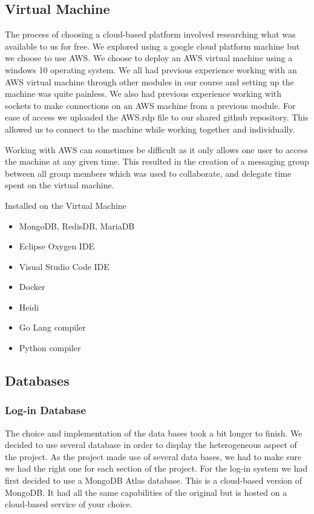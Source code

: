 \subsection{Virtual Machine}
The process of choosing a cloud-based platform involved researching what was available to us for free. We explored using a google cloud platform machine but we choose to use AWS. We choose to deploy an AWS virtual machine using a windows 10 operating system. We all had previous experience working with an AWS virtual machine through other modules in our course and setting up the machine was quite painless. We also had previous experience working with sockets to make connections on an AWS machine from a previous module. For ease of access we uploaded the AWS.rdp file to our shared github repository. This allowed us to connect to the machine while working together and individually.\newline

Working with AWS can sometimes be difficult as it only allows one user to access the machine at any given time. This resulted in the creation of a messaging group between all group members which was used to collaborate, and delegate time spent on the virtual machine.\newline
\cite{13214346620180901}

\newline
Installed on the Virtual Machine
\begin{itemize}
\item MongoDB, RedisDB, MariaDB
\item Eclipse Oxygen IDE
\item Visual Studio Code IDE
\item Docker
\item Heidi
\item Go Lang compiler
\item Python compiler
\end{itemize}

\subsection{Databases}
\subsubsection{Log-in Database}
The choice and implementation of the data bases took a bit longer to finish. We decided to use several database in order to display the heterogeneous aspect of the project. As the project made use of several data bases, we had to make sure we had the right one for each section of the project. For the log-in system we had first decided to use a MongoDB Atlas database. This is a cloud-based version of MongoDB. It had all the same capabilities of the original but is hosted on a cloud-based service of your choice.
\newline

